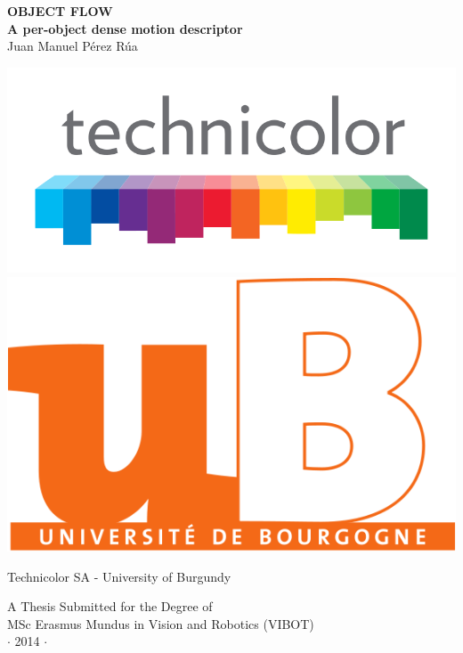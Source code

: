 
\newpage
\thispagestyle{empty}


\vspace*{1cm}
\begin{center}
{\huge\bf OBJECT FLOW\\}
{\large\bf A per-object dense motion descriptor\\}
\vspace{2cm} 
{\large Juan Manuel P\'erez R\'ua\\}
\vspace{1cm} 

\includegraphics[height=0.15\textheight]{images/logo/technicolor_large.png} \\
\includegraphics[height=0.1\textheight]{images/logo/ubourgogne.png}

\vspace{2cm} 
\normalsize{Technicolor SA  - University of Burgundy \\}
\end{center}

\vspace{2cm}
\begin{center}
{\large A Thesis Submitted for the Degree of \\MSc Erasmus Mundus
in Vision and Robotics (VIBOT) \\\vspace{0.3cm} $\cdot$ 2014
$\cdot$}
\end{center}
\singlespacing

